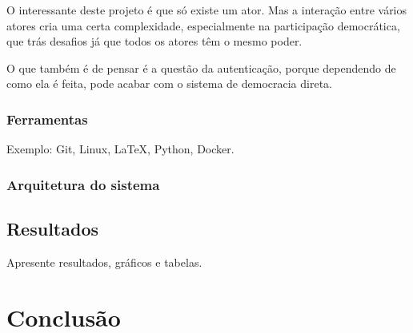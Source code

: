 \documentclass[12pt,a4paper,openright,oneside]{memoir}
\begin{document}
O interessante deste projeto é que só existe um ator. Mas a interação entre
vários atores cria uma certa complexidade, especialmente na participação
democrática, que trás desafios já que todos os atores têm o mesmo poder.

O que também é de pensar é a questão da autenticação, porque dependendo de como
ela é feita, pode acabar com o sistema de democracia direta.

\subsection{Ferramentas}
Exemplo: Git, Linux, \LaTeX, Python, Docker.

\subsection{Arquitetura do sistema}

\section{Resultados}
Apresente resultados, gráficos e tabelas.


\chapter{Conclusão}
\label{ch:conclusion}


\end{document}
